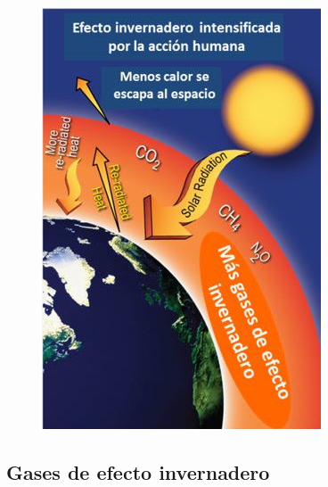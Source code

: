 \documentclass[14pt]{beamer}
\begin{document}
\begin{frame}
\vspace*{-0.5cm}
\begin{figure}
    \centering
    \includegraphics[scale=0.6]{Imagenes/Efecto_Invernadero_03.jpg}
\end{figure}
\end{frame}
 
\subsection{Gases de efecto invernadero}
\end{document}
